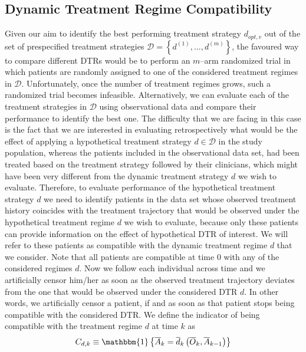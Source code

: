 \documentclass[12pt]{article}
\begin{document}
\subsection{Dynamic Treatment Regime Compatibility}\label{subsection:label2}

Given our aim to identify the best performing treatment strategy $d_{opt,v}$ out of the set of prespecified treatment strategies $\mathcal{D} = \left\lbrace d^{(1)}, \dots, d^{(m)} \right\rbrace$, the favoured way to compare different DTRs would be to perform an $m$--arm randomized trial in which patients are randomly assigned to one of the considered treatment regimes in $\mathcal{D}$. Unfortunately, once the number of treatment regimes grows, such a randomized trial becomes infeasible. Alternatively, we can evaluate each of the treatment strategies in $\mathcal{D}$ using observational data \citep{Cain2010, Hernan2016} and compare their performance to identify the best one. The difficulty that we are facing in this case is the fact that we are interested in evaluating retrospectively what would be the effect of applying a hypothetical treatment strategy $d \in \mathcal{D}$ in the study population, whereas the patients included in the observational data set, had been treated based on the treatment strategy followed by their clinicians, which might have been very different from the dynamic treatment strategy $d$ we wish to evaluate. Therefore, to evaluate performance of the hypothetical treatment strategy $d$ we need to identify patients in the data set whose observed treatment history coincides with the treatment trajectory that would be observed under the hypothetical treatment regime $d$ we wish to evaluate, because only these patients can provide information on the effect of hypothetical DTR of interest. We will refer to these patients as compatible with the dynamic treatment regime $d$ that we consider. Note that all patients are compatible at time $0$ with any of the considered regimes $d$. Now we follow each individual across time and we artificially censor him/her as soon as the observed treatment trajectory deviates from the one that would be observed under the considered DTR $d$. In other words, we artificially censor a patient, if and as soon as that patient stops being compatible with the considered DTR.  We define the indicator of being compatible with the treatment regime $d$ at time $k$ as 
\begin{equation*}
C_{d,k} \equiv \mathbbm{1} \left\lbrace \overline{A}_k = \overline{d}_k \left( \overline{O}_k, \overline{A}_{k-1} \right) \right\rbrace
\end{equation*}
\end{document}

